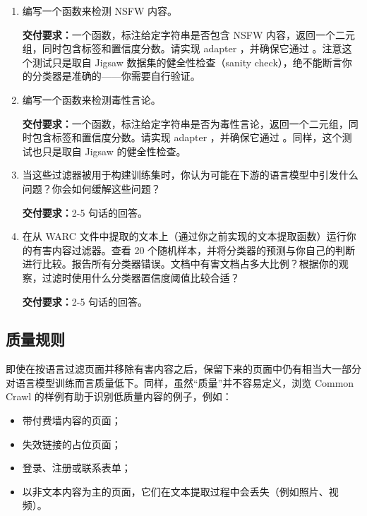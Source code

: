 \begin{enumerate}[label=(\alph*)]
  \item 编写一个函数来检测 NSFW 内容。

  \textbf{交付要求：}一个函数，标注给定字符串是否包含 NSFW 内容，返回一个二元组，同时包含标签和置信度分数。请实现 adapter ，并确保它通过 。注意这个测试只是取自 Jigsaw 数据集的健全性检查（sanity check），绝不能断言你的分类器是准确的——你需要自行验证。

  \item 编写一个函数来检测毒性言论。

  \textbf{交付要求：}一个函数，标注给定字符串是否为毒性言论，返回一个二元组，同时包含标签和置信度分数。请实现 adapter ，并确保它通过 。同样，这个测试也只是取自 Jigsaw 的健全性检查。

  \item 当这些过滤器被用于构建训练集时，你认为可能在下游的语言模型中引发什么问题？你会如何缓解这些问题？

  \textbf{交付要求：}2-5 句话的回答。

  \item 在从 WARC 文件中提取的文本上（通过你之前实现的文本提取函数）运行你的有害内容过滤器。查看 20 个随机样本，并将分类器的预测与你自己的判断进行比较。报告所有分类器错误。文档中有害文档占多大比例？根据你的观察，过滤时使用什么分类器置信度阈值比较合适？

  \textbf{交付要求：}2-5 句话的回答。
\end{enumerate}

\subsection{质量规则}

即使在按语言过滤页面并移除有害内容之后，保留下来的页面中仍有相当大一部分对语言模型训练而言质量低下。同样，虽然“质量”并不容易定义，浏览 Common Crawl 的样例有助于识别低质量内容的例子，例如：
\begin{itemize}
  \item 带付费墙内容的页面；
  \item 失效链接的占位页面；
  \item 登录、注册或联系表单；
  \item 以非文本内容为主的页面，它们在文本提取过程中会丢失（例如照片、视频）。
\end{itemize}

